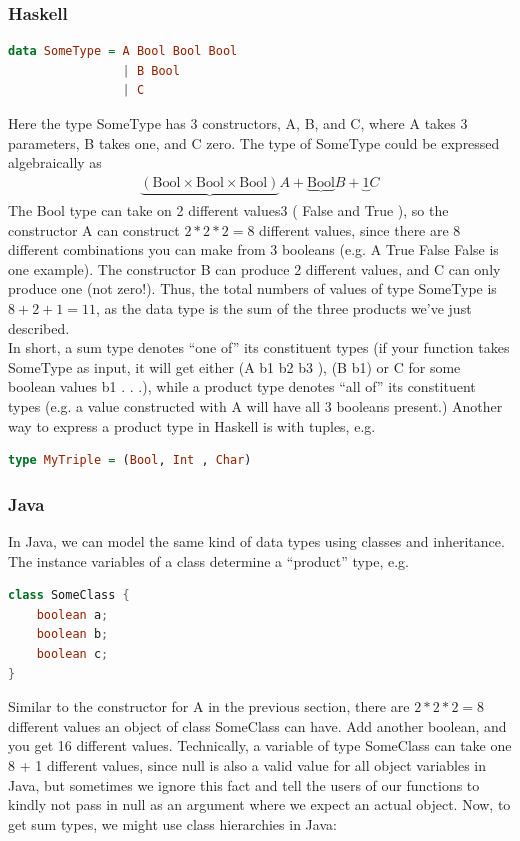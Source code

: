 \documentclass{article}
\begin{document}
\begin{itemize}
            \subsubsection*{Haskell}
            \begin{lstlisting}[language=Haskell]
data SomeType = A Bool Bool Bool
                | B Bool
                | C
            \end{lstlisting}
            Here the type SomeType has 3 constructors, A, B, and C, where A takes 3 parameters, B takes one, and C zero. 
            The type of SomeType could be expressed algebraically as
            \begin{align*}
                \underbrace{(\text{Bool} \times \text{Bool} \times \text{Bool})}{A} + \underbrace{\text{Bool}}{B} + \underbrace{1}{C}
            \end{align*}
            The Bool type can take on 2 different values3
            ( False and True ), so the constructor A
            can construct $2 * 2 * 2 = 8$ different values, since there are 8 different combinations you can
            make from 3 booleans (e.g. A True False False is one example). The constructor B can
            produce 2 different values, and C can only produce one (not zero!).
            Thus, the total numbers of values of type SomeType is $8 + 2 + 1 = 11$, as the data type
            is the sum of the three products we've just described.\\
            In short, a sum type denotes “one of” its constituent types (if your function takes SomeType
            as input, it will get either (A b1 b2 b3 ), (B b1) or C for some boolean values b1 . . .), while
            a product type denotes “all of” its constituent types (e.g. a value constructed with A will
            have all 3 booleans present.) Another way to express a product type in Haskell is with tuples,
            e.g.
            \begin{lstlisting}[language=Haskell]
type MyTriple = (Bool, Int , Char)
            \end{lstlisting}
            \subsubsection*{Java}
            In Java, we can model the same kind of data types using classes and inheritance. The instance
            variables of a class determine a “product” type, e.g.
            \begin{lstlisting}[language=Java]
class SomeClass {
    boolean a;
    boolean b;
    boolean c;
}
            \end{lstlisting}
        Similar to the constructor for A in the previous section, there are $2 * 2 * 2 = 8$ different
values an object of class SomeClass can have. Add another boolean, and you get 16 different
values. Technically, a variable of type SomeClass can take one 8 + 1 different values, since
null is also a valid value for all object variables in Java, but sometimes we ignore this fact
and tell the users of our functions to kindly not pass in null as an argument where we expect
an actual object.
Now, to get sum types, we might use class hierarchies in Java:


\end{itemize}
\end{document}
